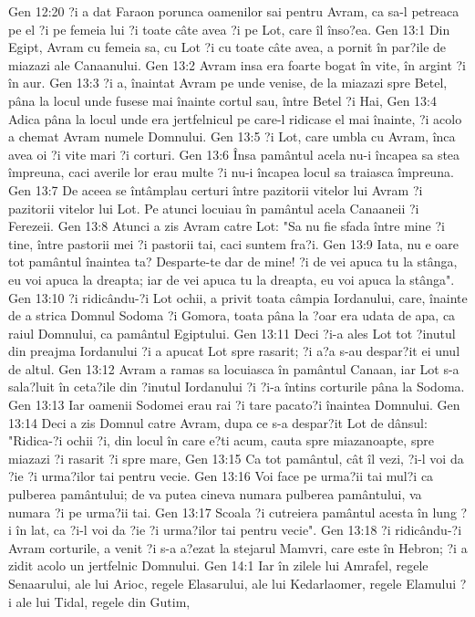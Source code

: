 Gen 12:20  ?i a dat Faraon porunca oamenilor sai pentru Avram, ca sa-l petreaca pe el ?i pe femeia lui ?i toate câte avea ?i pe Lot, care îl înso?ea.
Gen 13:1  Din Egipt, Avram cu femeia sa, cu Lot ?i cu toate câte avea, a pornit în par?ile de miazazi ale Canaanului.
Gen 13:2  Avram insa era foarte bogat în vite, în argint ?i în aur.
Gen 13:3  ?i a, înaintat Avram pe unde venise, de la miazazi spre Betel, pâna la locul unde fusese mai înainte cortul sau, între Betel ?i Hai,
Gen 13:4  Adica pâna la locul unde era jertfelnicul pe care-l ridicase el mai înainte, ?i acolo a chemat Avram numele Domnului.
Gen 13:5  ?i Lot, care umbla cu Avram, înca avea oi ?i vite mari ?i corturi.
Gen 13:6  Însa pamântul acela nu-i încapea sa stea împreuna, caci averile lor erau multe ?i nu-i încapea locul sa traiasca împreuna.
Gen 13:7  De aceea se întâmplau certuri între pazitorii vitelor lui Avram ?i pazitorii vitelor lui Lot. Pe atunci locuiau în pamântul acela Canaaneii ?i Ferezeii.
Gen 13:8  Atunci a zis Avram catre Lot: "Sa nu fie sfada între mine ?i tine, între pastorii mei ?i pastorii tai, caci suntem fra?i.
Gen 13:9  Iata, nu e oare tot pamântul înaintea ta? Desparte-te dar de mine! ?i de vei apuca tu la stânga, eu voi apuca la dreapta; iar de vei apuca tu la dreapta, eu voi apuca la stânga".
Gen 13:10  ?i ridicându-?i Lot ochii, a privit toata câmpia Iordanului, care, înainte de a strica Domnul Sodoma ?i Gomora, toata pâna la ?oar era udata de apa, ca raiul Domnului, ca pamântul Egiptului.
Gen 13:11  Deci ?i-a ales Lot tot ?inutul din preajma Iordanului ?i a apucat Lot spre rasarit; ?i a?a s-au despar?it ei unul de altul.
Gen 13:12  Avram a ramas sa locuiasca în pamântul Canaan, iar Lot s-a sala?luit în ceta?ile din ?inutul Iordanului ?i ?i-a întins corturile pâna la Sodoma.
Gen 13:13  Iar oamenii Sodomei erau rai ?i tare pacato?i înaintea Domnului.
Gen 13:14  Deci a zis Domnul catre Avram, dupa ce s-a despar?it Lot de dânsul: "Ridica-?i ochii ?i, din locul în care e?ti acum, cauta spre miazanoapte, spre miazazi ?i rasarit ?i spre mare,
Gen 13:15  Ca tot pamântul, cât îl vezi, ?i-l voi da ?ie ?i urma?ilor tai pentru vecie.
Gen 13:16  Voi face pe urma?ii tai mul?i ca pulberea pamântului; de va putea cineva numara pulberea pamântului, va numara ?i pe urma?ii tai.
Gen 13:17  Scoala ?i cutreiera pamântul acesta în lung ?i în lat, ca ?i-l voi da ?ie ?i urma?ilor tai pentru vecie".
Gen 13:18  ?i ridicându-?i Avram corturile, a venit ?i s-a a?ezat la stejarul Mamvri, care este în Hebron; ?i a zidit acolo un jertfelnic Domnului.
Gen 14:1  Iar în zilele lui Amrafel, regele Senaarului, ale lui Arioc, regele Elasarului, ale lui Kedarlaomer, regele Elamului ?i ale lui Tidal, regele din Gutim,
